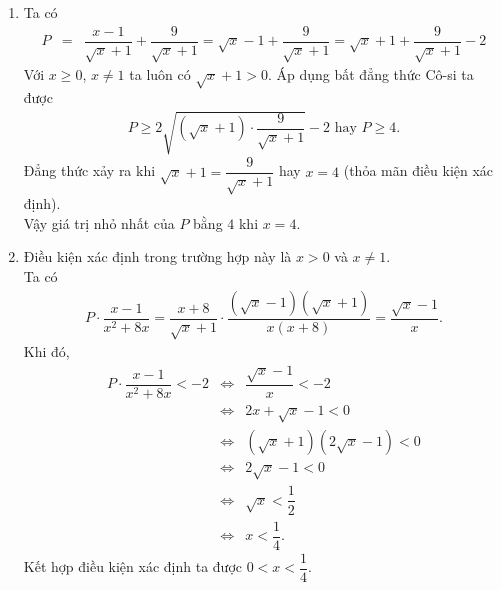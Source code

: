 \begin{bt}
{\begin{enumerate}
			\item Ta có
			\allowdisplaybreaks
			\begin{eqnarray*}
				P &=& \dfrac{x-1}{\sqrt{x}+1} + \dfrac{9}{\sqrt{x}+1} = \sqrt{x}-1 + \dfrac{9}{\sqrt{x}+1} = \sqrt{x}+1+\dfrac{9}{\sqrt{x}+1}-2
			\end{eqnarray*}
			Với $x\geq 0$, $x\neq 1$ ta luôn có $\sqrt{x}+1>0$. Áp dụng bất đẳng thức Cô-si ta được
			\begin{eqnarray*}
				P \geq 2\sqrt{\left(\sqrt{x}+1\right) \cdot \dfrac{9}{\sqrt{x}+1}} - 2 \text{ hay } P \geq 4.
			\end{eqnarray*}
			Đẳng thức xảy ra khi $\sqrt{x}+1=\dfrac{9}{\sqrt{x}+1}$ hay $x=4$ (thỏa mãn điều kiện xác định).\\
			Vậy giá trị nhỏ nhất của $P$ bằng $4$ khi $x=4$.
			\item Điều kiện xác định trong trường hợp này là $x > 0$ và $x \neq 1$.\\
			Ta có
			\allowdisplaybreaks
			\begin{eqnarray*}
				P \cdot \dfrac{x-1}{x^2+8x} = \dfrac{x+8}{\sqrt{x}+1} \cdot \dfrac{\left(\sqrt{x}-1\right)\left(\sqrt{x}+1\right)}{x(x+8)} = \dfrac{\sqrt{x}-1}{x}.
			\end{eqnarray*}
			Khi đó,
			\allowdisplaybreaks
			\begin{eqnarray*}
				P \cdot \dfrac{x-1}{x^2+8x}<-2 &\Leftrightarrow& \dfrac{\sqrt{x}-1}{x} < -2\\
				&\Leftrightarrow & 2x+\sqrt{x}-1<0\\
				&\Leftrightarrow & \left(\sqrt{x}+1\right)\left(2\sqrt{x}-1\right) < 0\\
				&\Leftrightarrow & 2\sqrt{x}-1<0\\
				&\Leftrightarrow & \sqrt{x}<\dfrac{1}{2}\\
				&\Leftrightarrow & x<\dfrac{1}{4}.
			\end{eqnarray*}
			Kết hợp điều kiện xác định ta được $0<x<\dfrac{1}{4}$.
		\end{enumerate}
	}
\end{bt}


